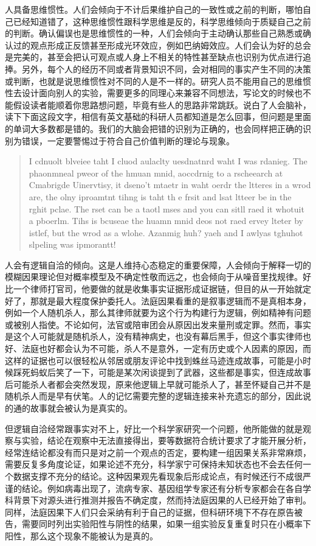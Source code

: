 \documentclass[]{tufte-book}
\begin{document}
人具备思维惯性。人们会倾向于不计后果维护自己的一致性或之前的判断，哪怕自己已经知道错了，这种思维惯性跟科学思维是反的，科学思维倾向于质疑自己之前的判断。确认偏误也是思维惯性的一种，人们会倾向于主动确认那些自己熟悉或确认过的观点形成正反馈甚至形成光环效应，例如巴纳姆效应。人们会认为好的总会是完美的，甚至会把认可观点或人身上不相关的特性甚至缺点也识别为优点进行追捧。另外，每个人的经历不同或者背景知识不同，会对相同的事实产生不同的决策或判断，也就是说思维惯性对不同的人是不一样的。研究人员不能用自己的思维惯性去设计面向别人的实验，需要更多的同理心来兼容不同想法，写论文的时候也不能假设读者能顺着你思路想问题，毕竟有些人的思路非常跳跃。说白了人会脑补，读下下面这段文字，相信有英文基础的科研人员都知道是怎么回事，但问题是里面的单词大多数都是错的。我们的大脑会把错的识别为正确的，也会同样把正确的识别为错误，一定要警惕过于符合自己价值判断的理论与现象。

\begin{quote}
I cdnuolt blveiee taht I cluod aulaclty uesdnatnrd waht I was rdanieg. The phaonmneal pweor of the hmuan mnid, aoccdrnig to a rscheearch at Cmabrigde Uinervtisy, it dseno't mtaetr in waht oerdr the ltteres in a wrod are, the olny iproamtnt tihng is taht th e frsit and lsat ltteer be in the rghit pclae. The rset can be a taotl mses and you can sitll raed it whotuit a pboerlm. Tihs is bcuseae the huamn mnid deos not raed ervey lteter by istlef, but the wrod as a wlohe. Azanmig huh? yaeh and I awlyas tghuhot slpeling was ipmorantt!
\end{quote}

人会有逻辑自洽的倾向。这是人维持心态稳定的重要保障，人会倾向于解释一切的模糊因果理论但对概率模型及不确定性敬而远之，也会倾向于从噪音里找规律。好比一个律师打官司，他要做的就是收集事实证据形成证据链，但目的从一开始就定好了，那就是最大程度保护委托人。法庭因果看重的是叙事逻辑而不是真相本身，例如一个人随机杀人，那么其律师就要为这个行为构建行为逻辑，例如精神有问题或被别人指使。不论如何，法官或陪审团会从原因出发来量刑或定罪。然而，事实是这个人可能就是随机杀人，没有精神病史，也没有幕后黑手，但这个事实律师也好、法庭也好都会认为不可能，杀人不是意外，一定有历史或个人因素的原因，而这样的证据也可以很轻松从邻居或朋友评论中找到蛛丝马迹连成故事，可能是小时候踩死蚂蚁后笑了一下，可能是某次闲谈提到了武器，这些都是事实，但连成故事后可能杀人者都会突然发现，原来他逻辑上早就可能杀人了，甚至怀疑自己并不是随机杀人而是早有伏笔。人的记忆需要完整的逻辑连接来补充遗忘的部分，因此说的通的故事就会被认为是真实的。

但逻辑自洽经常跟事实对不上，好比一个科学家研究一个问题，他所能做的就是观察与实验，结论在观察中无法直接得出，要等数据符合统计要求了才能开展分析，经常连结论都没有而只是对之前一个观点的否定，要构建一组因果关系非常麻烦，需要反复多角度论证，如果论述不充分，科学家宁可保持未知状态也不会去任何一个数据支撑不充分的结论。这种因果观先看现象后形成论点，有时候还行不成很严谨的结论。例如病毒出现了，流病专家、基因组学专家还有分析专家都会在各自学科背景下对源头进行推测并报告不确定度，然而持法庭因果的人已经开始了审判。同样，法庭因果下人们只会采纳有利于自己的证据，但科研环境下不存在原告被告，需要同时列出实验阳性与阴性的结果，如果一组实验反复重复时只在小概率下阳性，那么这个现象不能被认为是真的。
\end{document}
